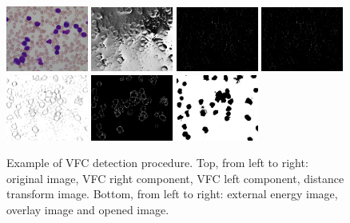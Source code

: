 \documentclass[final,a4paper,12pt,english]{UnicaPhdThesis3}
\begin{document}
{\begin{figure}[h]
	\centering
	\hspace{-1.5mm}\includegraphics[width=0.24\textwidth]{images/2018_1_visapp/015_1}\vspace{1 mm}
	\includegraphics[width=0.24\textwidth]{images/2018_1_visapp/figure2}
	\includegraphics[width=0.24\textwidth]{images/2018_1_visapp/figure3}
	\includegraphics[width=0.24\textwidth]{images/2018_1_visapp/figure3}
	\includegraphics[width=0.24\textwidth]{images/2018_1_visapp/figure4}
	\includegraphics[width=0.24\textwidth]{images/2018_1_visapp/figure5}
	\includegraphics[width=0.24\textwidth]{images/2018_1_visapp/figure7}
	\caption{\label{fig:vfc1}Example of VFC detection procedure. Top, from left to right: original image, VFC right component, VFC left component, distance transform image. Bottom, from left to right: external energy image, overlay image and opened image.}
\end{figure}

}
\end{document}

